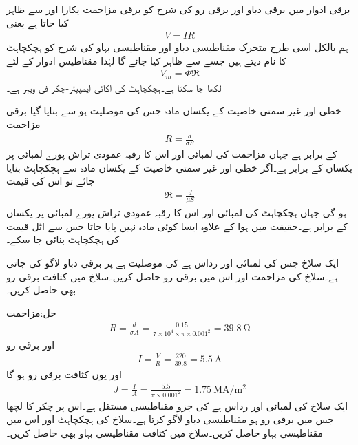 برقی ادوار میں برقی دباو اور برقی رو کی شرح کو برقی مزاحمت پکارا اور  سے ظاہر کیا جاتا ہے یعنی
\begin{align}
V=I R
\end{align}
 ہم بالکل اسی طرح متحرک مقناطیسی دباو اور مقناطیسی بہاو کی شرح کو ہچکچاہٹ کا نام دیتے ہیں جسے  سے ظاہر کیا جائے گا لہٰذا مقناطیس ادوار کے لئے
\begin{align}
V_m=\Phi \Re
\end{align}
لکھا جا سکتا ہے۔ہچکچاہٹ کی اکائی ایمپیئر-چکر فی ویبر  ہے۔

خطی اور غیر سمتی خاصیت کے  یکساں مادہ جس کی موصلیت  ہو سے بنایا گیا برقی مزاحمت
\begin{align}
R=\frac{d}{\sigma S}
\end{align}
کے برابر ہے جہاں مزاحمت کی لمبائی  اور اس کا رقبہ عمودی تراش پورے لمبائی پر یکساں  کے برابر ہے۔اگر خطی اور غیر سمتی خاصیت کے یکساں مادہ سے ہچکچاہٹ بنایا جائے تو اس کی قیمت
\begin{align}
\Re=\frac{d}{\mu S}
\end{align}
ہو گی جہاں ہچکچاہٹ کی لمبائی  اور اس کا رقبہ عمودی تراش پورے لمبائی پر یکساں  کے برابر ہے۔حقیقت میں ہوا کے علاوہ ایسا کوئی مادہ نہیں پایا جاتا جس سے اٹل قیمت کی ہچکچاہٹ بنائی جا سکے۔

ایک سلاخ جس کی لمبائی  اور رداس  ہے کی موصلیت  ہے پر  برقی دباو لاگو کی جاتی ہے۔سلاخ کی مزاحمت اور اس میں برقی رو حاصل کریں۔سلاخ میں کثافت برقی رو بھی حاصل کریں۔

حل:مزاحمت
\begin{align*}
R=\frac{d}{\sigma A}=\frac{0.15}{7 \times 10^4 \times \pi \times 0.001^2}=\SI{39.8}{\ohm}
\end{align*}
اور برقی رو
\begin{align*}
I=\frac{V}{R}=\frac{220}{39.8}=\SI{5.5}{\ampere}
\end{align*}
اور یوں کثافت برقی رو ہو گا
\begin{align*}
J=\frac{I}{A}=\frac{5.5}{\pi\times 0.001^2}=\SI{1.75}{\mega \ampere \per \meter \squared}
\end{align*}
ایک سلاخ کی لمبائی  اور رداس  ہے کی جزو مقناطیسی مستقل  ہے۔اس پر  چکر کا لچھا جس میں  برقی رو ہو مقناطیسی دباو لاگو کرتا ہے۔سلاخ کی ہچکچاہٹ اور اس میں مقناطیسی بہاو حاصل کریں۔سلاخ میں کثافت مقناطیسی بہاو بھی حاصل کریں۔

